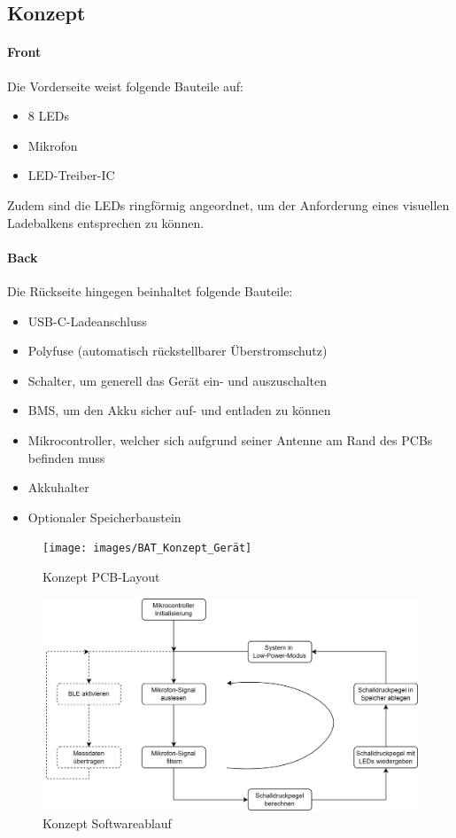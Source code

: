 \documentclass[12pt]{article}
\begin{document}
	\subsection{Konzept} \label{Konzept}
	\paragraph{Front}
	Die Vorderseite weist folgende Bauteile auf:
	\begin{itemize}
		\item 8 LEDs
		\item Mikrofon
		\item LED-Treiber-IC
	\end{itemize}
	Zudem sind die LEDs ringförmig angeordnet, um der Anforderung eines visuellen Ladebalkens entsprechen zu können.
	\paragraph{Back}
	Die Rückseite hingegen beinhaltet folgende Bauteile:
	\begin{itemize}
		\item USB-C-Ladeanschluss
		\item Polyfuse (automatisch rückstellbarer Überstromschutz)
		\item Schalter, um generell das Gerät ein- und auszuschalten
		\item BMS, um den Akku sicher auf- und entladen zu können
		\item Mikrocontroller, welcher sich aufgrund seiner Antenne am Rand des PCBs befinden muss
		\item Akkuhalter
		\item Optionaler Speicherbaustein
	\end{itemize}
	\begin{figure}[H]
		\centering
		\texttt{[image: images/BAT\_Konzept\_Gerät]}
		\caption{Konzept PCB-Layout}
		\label{fig:batkonzeptgerat}
	\end{figure}
	\begin{figure}[H]
		\centering
		\includegraphics[width=1\linewidth]{images/BAT_Konzept_Softwareablauf}
		\caption{Konzept Softwareablauf}
		\label{fig:batkonzeptsoftwareablauf}
	\end{figure}
	
\end{document}
